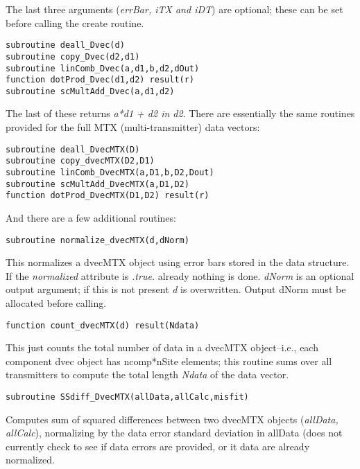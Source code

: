 \documentclass[12pt]{article}
\begin{document}
The last three arguments ({\it errBar, iTX and iDT}) are optional;
these can be set before calling the create routine.

\begin{verbatim}
subroutine deall_Dvec(d)
subroutine copy_Dvec(d2,d1)
subroutine linComb_Dvec(a,d1,b,d2,dOut)
function dotProd_Dvec(d1,d2) result(r)
subroutine scMultAdd_Dvec(a,d1,d2)
\end{verbatim}

The last of these returns {\it a*d1 + d2 in d2}.
There are essentially the same routines provided for the
full MTX (multi-transmitter) data vectors:

\begin{verbatim}
subroutine deall_DvecMTX(D)
subroutine copy_dvecMTX(D2,D1)
subroutine linComb_DvecMTX(a,D1,b,D2,Dout)
subroutine scMultAdd_DvecMTX(a,D1,D2)
function dotProd_DvecMTX(D1,D2) result(r)
\end{verbatim}

And there are a few additional routines:

\begin{verbatim}
subroutine normalize_dvecMTX(d,dNorm)
\end{verbatim}

This normalizes a dvecMTX object using error bars
stored in the data structure.  If the {\it normalized}
attribute is {\it .true.} already nothing is done.
{\it dNorm} is an optional output argument; 
if this is not present {\it d} is overwritten.
Output dNorm must be allocated before calling.

\begin{verbatim}
function count_dvecMTX(d) result(Ndata)
\end{verbatim}

This just counts the total number of data in a dvecMTX
object--i.e., each component dvec object has ncomp*nSite
elements; this routine sums over all transmitters to compute
the total length {\it Ndata} of the data vector.

\begin{verbatim}
subroutine SSdiff_DvecMTX(allData,allCalc,misfit)
\end{verbatim}

Computes sum of squared differences between two
dvecMTX objects ({\it allData, allCalc}), normalizing
by the data error standard deviation in allData
(does not currently check to see if data errors
are provided, or it data are already normalized.

\vspace{10pt}
\end{document}
